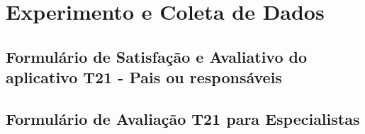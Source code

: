 \chapter{Experimento e Coleta de Dados}\label{chp:exp}

\section{Formulário de Satisfação e Avaliativo do aplicativo T21 - Pais ou responsáveis}


\section{Formulário de Avaliação T21 para Especialistas}



\blindtext